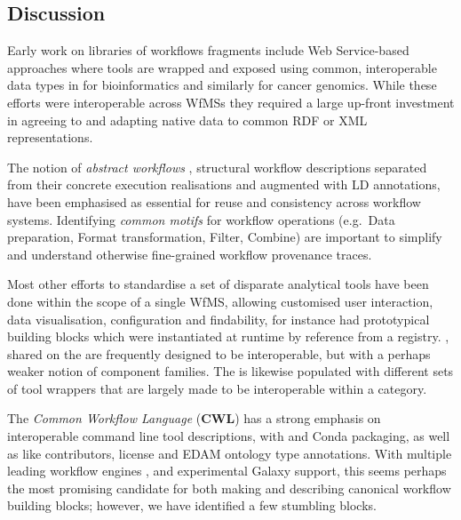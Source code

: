 \subsection{Discussion}\label{ch6:discussion}

Early work on libraries of workflows fragments include Web Service-based approaches where tools are wrapped and exposed using common, interoperable data types in  \cite{BioMoby 2008} for bioinformatics and similarly  \cite{Saltz 2006} for cancer genomics.
While these efforts were interoperable across WfMSs they required a large up-front investment in agreeing to and adapting native data to common RDF or XML representations.

The notion of \emph{abstract workflows} \cite{Garijo 2011}, structural workflow descriptions separated from their concrete execution realisations and augmented with \acrlong{LD} annotations, have been emphasised as essential for reuse and consistency across workflow systems.
Identifying \emph{common motifs} for workflow operations \cite{Garijo 2014a} (e.g.~Data preparation, Format transformation, Filter, Combine) are important to simplify and understand otherwise fine-grained workflow provenance traces.

Most other efforts to standardise a set of disparate analytical tools have been done within the scope of a single WfMS, allowing customised user interaction, data visualisation, configuration and findability, for instance  had prototypical building blocks \cite{De Giovanni 2016} which were instantiated at runtime by reference from a registry. 
, shared on the  are frequently designed to be interoperable, but with a perhaps weaker notion of component families.
The  \cite{Blankenberg 2014} is likewise populated with different sets of tool wrappers that are largely made to be interoperable within a category.

The \emph{Common Workflow Language} (\textbf{CWL}) \cite{Crusoe 2022} has a strong emphasis on interoperable command line tool descriptions, with  and Conda packaging, as well as  like contributors, license and EDAM ontology type annotations.
With multiple leading workflow engines , and experimental Galaxy support, this seems perhaps the most promising candidate for both making and describing canonical workflow building blocks; however, we have identified a few stumbling blocks.

